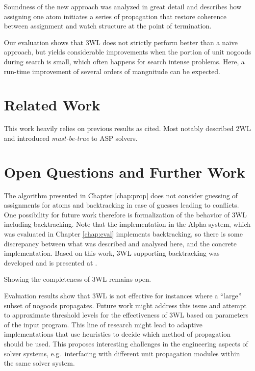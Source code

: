 \documentclass[final]{vutinfth} %
\newcommand{\mbt}{must-be-true\xspace}
\begin{document}
Soundness of the new approach was analyzed in great detail and describes how assigning one atom initiates a series of propagation that restore coherence between assignment and watch structure at the point of termination.

Our evaluation shows that 3WL does not strictly perform better than a na\"{i}ve approach, but yields considerable improvements when the portion of unit nogoods during search is small, which often happens for search intense problems. Here, a run-time improvement of several orders of mangnitude can be expected.

\section{Related Work}

This work heavily relies on previous results as cited. Most notably \citet{effsat,questsat} described 2WL and \citet{dlv-mbt} introduced \emph{\mbt} to ASP solvers.

\section{Open Questions and Further Work}

The algorithm presented in Chapter \ref{chap:prop} does not consider guessing of assignments for atoms and backtracking in case of guesses leading to conflicts. One possibility for future work therefore is formalization of the behavior of 3WL including backtracking. Note that the implementation in the Alpha system, which was evaluated in Chapter \ref{chap:eval} implements backtracking, so there is some discrepancy between what was described and analysed here, and the concrete implementation. Based on this work, 3WL supporting backtracking was developed and is presented at \cite{alpha-techniques}.

Showing the completeness of 3WL remains open.

Evaluation results show that 3WL is not effective for instances where a \enquote{large} subset of nogoods propagates. Future work might address this issue and attempt to approximate threshold levels for the effectiveness of 3WL based on parameters of the input program. This line of research might lead to adaptive implementations that use heuristics to decide which method of propagation should be used. This proposes interesting challenges in the engineering aspects of solver systems, e.g.~interfacing with different unit propagation modules within the same solver system.
\end{document}
